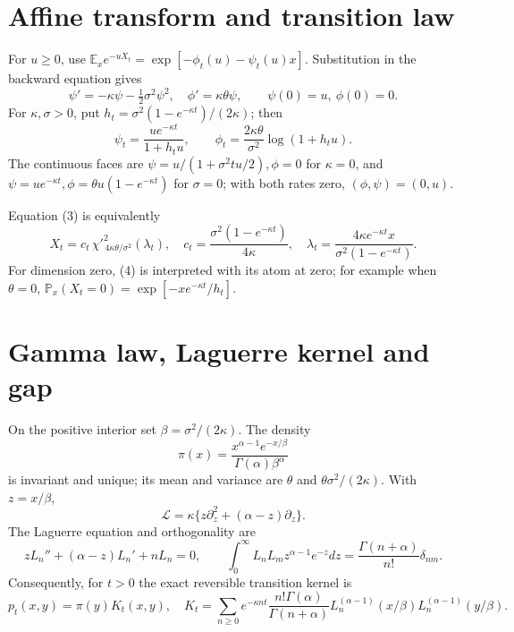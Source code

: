 \documentclass[10pt]{article}
\newcommand{\E}{\mathbb E}
\newcommand{\PP}{\mathbb P}
\begin{document}
\section{Affine transform and transition law}
For $u\geq0$, use
$\E_xe^{-uX_t}=\exp[-\phi_t(u)-\psi_t(u)x]$.  Substitution in the backward
equation gives
\begin{equation}
 \psi'=-\kappa\psi-\tfrac12\sigma^2\psi^2,\quad
 \phi'=\kappa\theta\psi,\qquad \psi(0)=u,\ \phi(0)=0. \tag{2}
\end{equation}
For $\kappa,\sigma>0$, put $h_t=\sigma^2(1-e^{-\kappa t})/(2\kappa)$; then
\begin{equation}
 \psi_t=\frac{ue^{-\kappa t}}{1+h_tu},\qquad
 \phi_t=\frac{2\kappa\theta}{\sigma^2}\log(1+h_tu). \tag{3}
\end{equation}
The continuous faces are $\psi=u/(1+\sigma^2tu/2),\phi=0$ for $\kappa=0$,
and $\psi=ue^{-\kappa t},\phi=\theta u(1-e^{-\kappa t})$ for $\sigma=0$;
with both rates zero, $(\phi,\psi)=(0,u)$.

Equation (3) is equivalently
\begin{equation}
 X_t=c_t\,\chi'^2_{\,4\kappa\theta/\sigma^2}(\lambda_t),\quad
 c_t=\frac{\sigma^2(1-e^{-\kappa t})}{4\kappa},\quad
 \lambda_t=\frac{4\kappa e^{-\kappa t}x}{\sigma^2(1-e^{-\kappa t})}. \tag{4}
\end{equation}
For dimension zero, (4) is interpreted with its atom at zero; for example
when $\theta=0$, $\PP_x(X_t=0)=\exp[-xe^{-\kappa t}/h_t]$.

\section{Gamma law, Laguerre kernel and gap}
On the positive interior set $\beta=\sigma^2/(2\kappa)$.  The density
\begin{equation}
 \pi(x)=\frac{x^{\alpha-1}e^{-x/\beta}}{\Gamma(\alpha)\beta^\alpha}
 \tag{5}
\end{equation}
is invariant and unique; its mean and variance are $\theta$ and
$\theta\sigma^2/(2\kappa)$.  With $z=x/\beta$,
\begin{equation}
 \mathcal L=\kappa\{z\partial_z^2+(\alpha-z)\partial_z\}. \tag{6}
\end{equation}
The Laguerre equation and orthogonality are
\[
 zL_n''+(\alpha-z)L_n'+nL_n=0,\qquad
 \int_0^\infty L_nL_m z^{\alpha-1}e^{-z}dz
 =\frac{\Gamma(n+\alpha)}{n!}\delta_{nm}.
\]
Consequently, for $t>0$ the exact reversible transition kernel is
\begin{equation}
 p_t(x,y)=\pi(y)K_t(x,y),\quad
 K_t=\sum_{n\geq0}e^{-\kappa nt}\frac{n!\Gamma(\alpha)}{\Gamma(n+\alpha)}
 L_n^{(\alpha-1)}(x/\beta)L_n^{(\alpha-1)}(y/\beta). \tag{7}
\end{equation}
\end{document}
